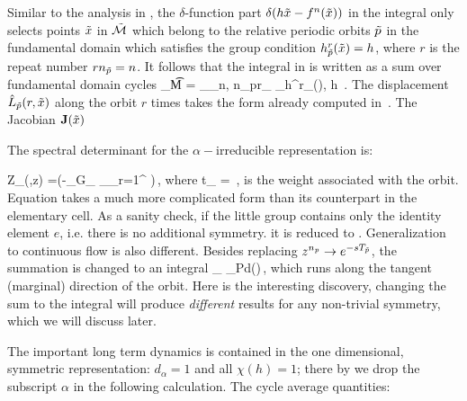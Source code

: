 Similar to the analysis in , the $\delta$-function part
$\delta (h\tilde x - f^n(\tilde x))$ in the integral only selects points $\tilde x$
in $\tilde{{\cal M}}$ which belong to the relative periodic orbits
${\tilde p}$ in the fundamental domain which satisfies the group condition
$h^{r}_{{\tilde p}}(\tilde x) = h$, where $r$ is the repeat number $r n_{\tilde p} = n$.
It follows that the integral in  is written as
a sum over fundamental domain cycles
\beq
\int_{\t {\cal M}} = \sum_{\tp}\delta_{n, n_pr}\sum_{\tx\in
\tp}\delta_{h^r_{\tp}(\tx), h}
\,.
\label{eq-trace-ir-expan}
\eeq 
The displacement $\hat{L}_{\tilde p}(r, \tilde x)$ along the orbit $r$ times takes
the form already computed in~.  The Jacobian
${\bf J}(\tilde x)$ 

The spectral determinant for the $\alpha-$irreducible
representation is:

 \beq
 Z_{\alpha}(\beta,z)
=\exp\left(-\sum_{\sigma\in G}\sum_{\tp}
    \sum_{\tx\in\tp}\sum_{r=1}^{\infty}
    \right)\,,
\label{eq-fd-zeta}
\eeq
where
\beq
    t_{\tp} =
\,,
\eeq
is the weight associated with the orbit. Equation 
takes a much more complicated form than its counterpart in the
elementary cell. As a sanity check, if the little group contains only
the identity element $e$, i.e. there is no additional symmetry. it is
reduced to . Generalization to continuous flow is
also different. Besides replacing $z^{n_p}\to e^{-s{T_{{\tilde p}}}}$, the
summation is changed to an integral
\beq
{}\sum_{\tx\in\tp}\to 
{}\oint_{\cal P}d\tau\tx(\tau)\,,
\eeq
which runs along the tangent (marginal) direction of the orbit. Here 
is the interesting discovery, changing the sum to 
the integral will produce \emph{different} results for any 
non-trivial symmetry, which we will discuss later.

The important long term dynamics is contained in the one dimensional, 
symmetric representation: $ d_\alpha = 1 $ and all $ \chi(h) = 1 
$; there by we drop the subscript $\alpha $ in the following 
calculation. The cycle average quantities:

